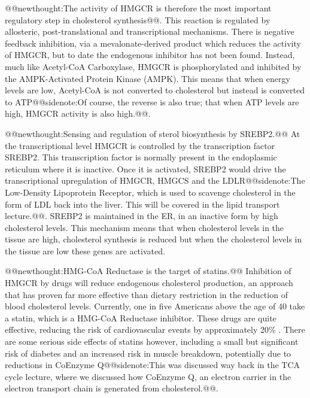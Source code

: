 \documentclass{tufte-handout}
\makeatletter
\def\newthought#1{@@newthought:#1@@}
\def\sidenote#1{@@sidenote:#1@@}
\makeatother
\begin{document}
\newthought{The activity of HMGCR is therefore the most important regulatory step in cholesterol synthesis}.  This reaction is regulated by allosteric, post-translational and transcriptional mechanisms.  There is negative feedback inhibition, via a mevalonate-derived product which reduces the activity of HMGCR, but to date the endogenous inhibitor has not been found.  Instead, much like Acetyl-CoA Carboxylase, HMGCR is phosphorylated and inhibited by the AMPK-Activated Protein Kinase (AMPK).  This means that when energy levels are low, Acetyl-CoA is not converted to cholesterol but instead is converted to ATP\sidenote{Of course, the reverse is also true; that when ATP levels are high, HMGCR activity is also high.}. 

\newthought{Sensing and regulation of sterol biosynthesis by SREBP2.}  At the transcriptional level HMGCR is controlled by the transcription factor SREBP2.  This transcription factor is normally present in the endoplasmic reticulum where it is inactive.  Once it is activated, SREBP2 would drive the transcriptional upregulation of HMGCR, HMGCS and the LDLR\sidenote{The Low-Density Lipoprotein Receptor, which is used to scavenge cholesterol in the form of LDL\nomenclature{LDL}{Low-Density Lipoprotein}\index{Lipoproteins!LDL} back into the liver.  This will be covered in the lipid transport lecture.}.  SREBP2 is maintained in the ER, in an inactive form by high cholesterol levels.  This mechanism means that when cholesterol levels in the tissue are high, cholesterol synthesis is reduced but when the cholesterol levels in the tissue are low these genes are activated.

\newthought{HMG-CoA Reductase is the target of statins.}  Inhibition of HMGCR by drugs will reduce endogenous cholesterol production, an approach that has proven far more effective than dietary restriction in the reduction of blood cholesterol levels. Currently, one in five Americans above the age of 40 take a statin, which is a HMG-CoA Reductase inhibitor.  These drugs are quite effective, reducing the risk of cardiovascular events by approximately 20\% \citep{Treatment2010}.  There are some serious side effects of statins however, including a small but significant risk of diabetes and an increased risk in muscle breakdown, potentially due to reductions in CoEnzyme Q\sidenote{This was discussed way back in the TCA cycle lecture, where we discussed how CoEnzyme Q, an electron carrier in the electron transport chain is generated from cholesterol.}.
\end{document}
